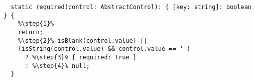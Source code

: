 \begin{verbatim}
  static required(control: AbstractControl): { [key: string]: boolean } {
    %\step{1}%
    return;
    %\step{2}% isBlank(control.value) ||
    (isString(control.value) && control.value == '')
      ? %\step{3}% { required: true }
      : %\step{4}% null;
  }
\end{verbatim}
